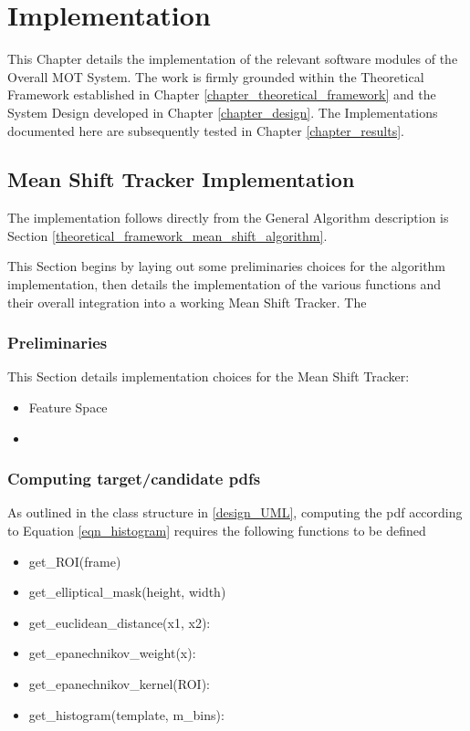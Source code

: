 \chapter{Implementation} \label{chapter_implementation}

This Chapter details the implementation of the relevant software modules of the
Overall MOT System. The work is firmly grounded within the Theoretical Framework
established in Chapter \ref{chapter_theoretical_framework} and the System Design
developed in Chapter \ref{chapter_design}. The Implementations documented here
are subsequently tested in Chapter \ref{chapter_results}.

\section{Mean Shift Tracker Implementation}\label{implementation_mean_shift_tracker}
The implementation follows directly from the General Algorithm description is
Section \ref{theoretical_framework_mean_shift_algorithm}.

This Section begins by laying out some preliminaries choices for the algorithm
implementation, then details the implementation of the various functions and
their overall integration into a working Mean Shift Tracker. The  

\subsection{Preliminaries}
This Section details implementation choices for the Mean Shift Tracker:
\begin{itemize}
    \item Feature Space
    \item  
\end{itemize}

\subsection{Computing target/candidate pdfs}
As outlined in the class structure in \ref{design_UML}, computing the pdf according to Equation \ref{eqn_histogram} requires the
following functions to be defined

\begin{itemize}
    \item get\_ROI(frame)
    \item get\_elliptical\_mask(height, width)
    \item get\_euclidean\_distance(x1, x2):
    \item get\_epanechnikov\_weight(x):
    \item get\_epanechnikov\_kernel(ROI):
    \item get\_histogram(template, m\_bins): 
\end{itemize}

